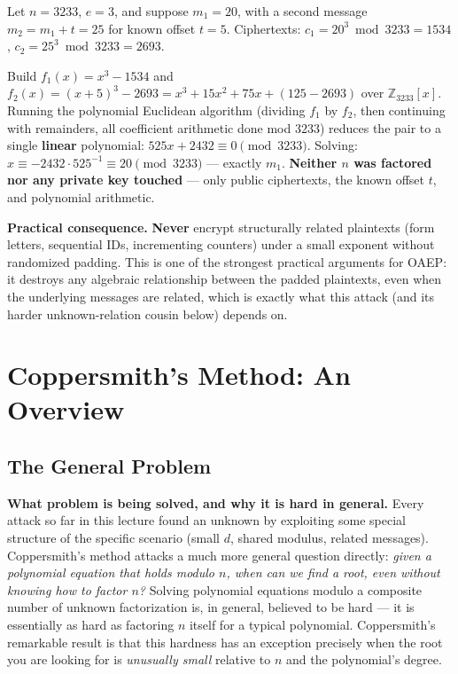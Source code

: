 \begin{example}
Let $n=3233$, $e=3$, and suppose $m_1 = 20$, with a second message $m_2 = m_1 + t = 25$ for known offset $t=5$. Ciphertexts: $c_1 = 20^3 \bmod 3233 = 1534$, $c_2 = 25^3 \bmod 3233 = 2693$.

Build $f_1(x) = x^3 - 1534$ and $f_2(x) = (x+5)^3 - 2693 = x^3 + 15x^2 + 75x + (125-2693)$ over $\mathbb{Z}_{3233}[x]$. Running the polynomial Euclidean algorithm (dividing $f_1$ by $f_2$, then continuing with remainders, all coefficient arithmetic done mod $3233$) reduces the pair to a single \textbf{linear} polynomial: $525x + 2432 \equiv 0 \pmod{3233}$. Solving: $x \equiv -2432 \cdot 525^{-1} \equiv 20 \pmod{3233}$ — exactly $m_1$. \textbf{Neither $n$ was factored nor any private key touched} — only public ciphertexts, the known offset $t$, and polynomial arithmetic.
\end{example}

\medskip\noindent\textbf{Practical consequence.} \textbf{Never} encrypt structurally related plaintexts (form letters, sequential IDs, incrementing counters) under a small exponent without randomized padding. This is one of the strongest practical arguments for OAEP: it destroys any algebraic relationship between the padded plaintexts, even when the underlying messages are related, which is exactly what this attack (and its harder unknown-relation cousin below) depends on.

\newpage
\section{Coppersmith's Method: An Overview}\label{sec:coppersmith}

\subsection{The General Problem}

\medskip\noindent\textbf{What problem is being solved, and why it is hard in general.} Every attack so far in this lecture found an unknown by exploiting some special structure of the specific scenario (small $d$, shared modulus, related messages). Coppersmith's method attacks a much more general question directly: \emph{given a polynomial equation that holds modulo $n$, when can we find a root, even without knowing how to factor $n$?} Solving polynomial equations modulo a composite number of unknown factorization is, in general, believed to be hard — it is essentially as hard as factoring $n$ itself for a typical polynomial. Coppersmith's remarkable result is that this hardness has an exception precisely when the root you are looking for is \emph{unusually small} relative to $n$ and the polynomial's degree.


